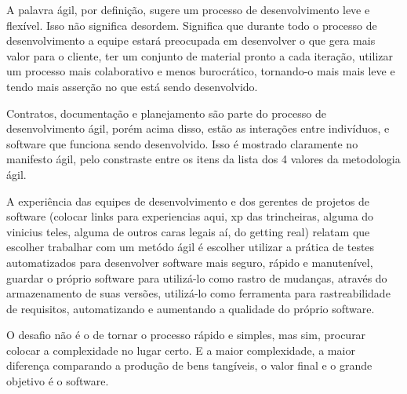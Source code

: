 A palavra ágil, por definição, sugere um processo de desenvolvimento leve e flexível. Isso não significa desordem. Significa que durante todo o processo de desenvolvimento a equipe estará preocupada em desenvolver o que gera mais valor para o cliente, ter um conjunto de material pronto a cada iteração, utilizar um processo mais colaborativo e menos burocrático, tornando-o mais mais leve e tendo mais asserção no que está sendo desenvolvido.

Contratos, documentação e planejamento são parte do processo de desenvolvimento ágil, porém acima disso, estão as interações entre indivíduos, e software que funciona sendo desenvolvido. Isso é mostrado claramente no manifesto ágil, pelo constraste entre os itens da lista dos 4 valores da metodologia ágil.

A experiência das equipes de desenvolvimento e dos gerentes de projetos de software (colocar links para experiencias aqui, xp das trincheiras, alguma do vinicius teles, alguma de outros caras legais aí, do getting real) relatam que escolher trabalhar com um metódo ágil é escolher utilizar a prática de testes automatizados para desenvolver software mais seguro, rápido e manutenível, guardar o próprio software para utilizá-lo como rastro de mudanças, através do armazenamento de suas versões, utilizá-lo como ferramenta para rastreabilidade de requisitos, automatizando e aumentando a qualidade do próprio software. 

O desafio não é o de tornar o processo rápido e simples, mas sim, procurar colocar a complexidade no lugar certo. E a maior complexidade, a maior diferença comparando a produção de bens tangíveis, o valor final e o grande objetivo é o software.






